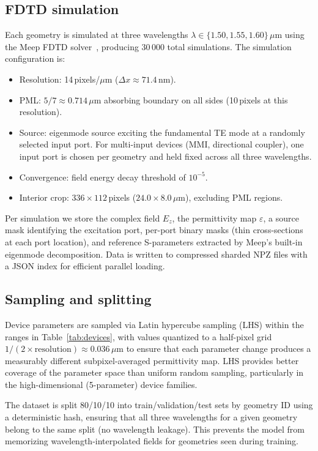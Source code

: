 \subsection{FDTD simulation}

Each geometry is simulated at three wavelengths $\lambda \in \{1.50, 1.55, 1.60\}\,\mu$m using the Meep FDTD
solver~\cite{Oskooi2010Meep}, producing 30\,000 total simulations. The simulation configuration is:

\begin{itemize}
    \item Resolution: 14\,pixels/$\mu$m ($\Delta x \approx 71.4$\,nm).
    \item PML: $5/7 \approx 0.714\,\mu$m absorbing boundary on all sides (10\,pixels at this resolution).
    \item Source: eigenmode source exciting the fundamental TE mode at a randomly selected input port. For multi-input
          devices (MMI, directional coupler), one input port is chosen per geometry and held fixed across all three
          wavelengths.
    \item Convergence: field energy decay threshold of $10^{-5}$.
    \item Interior crop: $336 \times 112$\,pixels ($24.0 \times 8.0\,\mu$m), excluding PML regions.
\end{itemize}

Per simulation we store the complex field $E_z$, the permittivity map $\varepsilon$, a source mask identifying the
excitation port, per-port binary masks (thin cross-sections at each port location), and reference S-parameters
extracted by Meep's built-in eigenmode decomposition. Data is written to compressed sharded NPZ files with a JSON
index for efficient parallel loading.

\subsection{Sampling and splitting}

Device parameters are sampled via Latin hypercube sampling (LHS) within the ranges in Table~\ref{tab:devices}, with
values quantized to a half-pixel grid $1/(2 \times \text{resolution}) \approx 0.036\,\mu$m to ensure that each
parameter change produces a measurably different subpixel-averaged permittivity map. LHS provides better coverage of
the parameter space than uniform random sampling, particularly in the high-dimensional (5-parameter) device families.

The dataset is split 80/10/10 into train/validation/test sets by geometry ID using a deterministic hash, ensuring that
all three wavelengths for a given geometry belong to the same split (no wavelength leakage). This prevents the model
from memorizing wavelength-interpolated fields for geometries seen during training.

